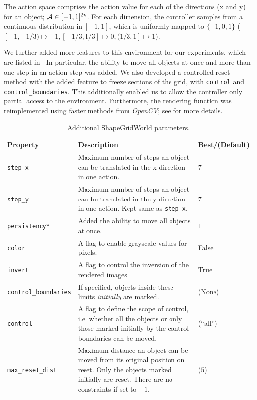 The action space comprises the action value for each of the directions (x and y) for an object; \(\mathcal{A} \in [-1, 1]^{2 n}\).
For each dimension, the controller samples from a continuous distribution in \([-1, 1]\), which is uniformly mapped to \(\{-1, 0, 1\}\) (\([-1, -1/3) \mapsto -1, [-1/3, 1/3] \mapsto 0, (1/3, 1] \mapsto 1\)).

We further added more features to this environment for our experiments, which are listed in .
In particular, the ability to move all objects at once and more than one step in an action step was added.
We also developed a controlled reset method with the added feature to freeze sections of the grid, with \texttt{control} and \texttt{control\_boundaries}.
This additionally enabled us to allow the controller only partial access to the environment.
Furthermore, the rendering function was reimplemented using faster methods from \emph{OpenCV}; see  for more details.

\begin{table}[H]
    \centering
    \caption{Additional ShapeGridWorld parameters.}
    \begin{tabularx}{\textwidth}{C{3.9cm} L C{2cm}}
        \hline
        Property & Description & Best/(Default)\\
        \hline
        \texttt{step\_x} & Maximum number of steps an object can be translated in the x-direction in one action. & \(7\)\\
        \texttt{step\_y} & Maximum number of steps an object can be translated in the y-direction in one action. Kept same as \texttt{step\_x}. & \(7\)\\
        \texttt{persistency*} & Added the ability to move all objects at once. & \(1\)\\
        \texttt{color} & A flag to enable grayscale values for pixels. & False\\
        \texttt{invert} & A flag to control the inversion of the rendered images.  & True\\
        \texttt{control\_boundaries} & If specified, objects inside these limits \emph{initially} are marked. & (None)\\
        \texttt{control} & A flag to define the scope of control, i.e. whether all the objects or only those marked initially by the control boundaries can be moved. & (``all'')\\
        \texttt{max\_reset\_dist} & Maximum distance an object can be moved from its original position on reset. Only the objects marked initially are reset. There are no constraints if set to \(-1\). & (\(5\))\\
        \hline
    \end{tabularx}
    \label{tab:additional-sgw-params}
\end{table}

